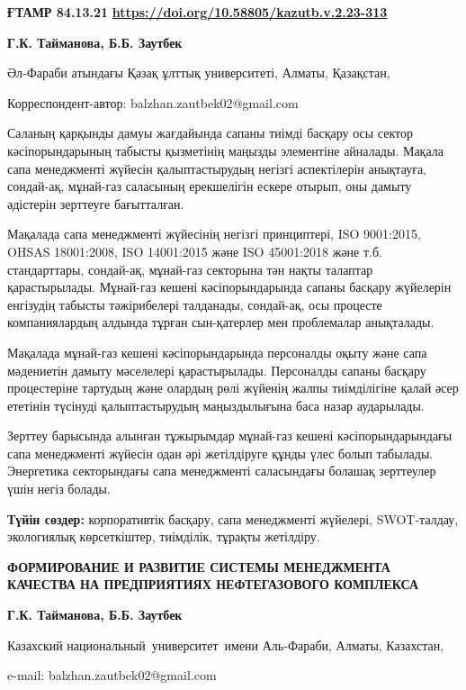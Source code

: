 \newpage
{}
{\bfseries ҒТАМР 84.13.21}
\hfill {\bfseries \href{https://doi.org/10.58805/kazutb.v.2.23-313}{https://doi.org/10.58805/kazutb.v.2.23-313}}


\begin{center}
{\bfseries Г.К. Тайманова, Б.Б. Заутбек\envelope}

Әл-Фараби атындағы Қазақ ұлттық университеті, Алматы, Қазақстан,

\envelope Корреспондент-автор:
balzhan.zautbek02@gmail.com
\end{center}

Саланың қарқынды дамуы жағдайында сапаны тиімді басқару осы сектор
кәсіпорындарының табысты қызметінің маңызды элементіне айналады. Мақала
сапа менеджменті жүйесін қалыптастырудың негізгі аспектілерін анықтауға,
сондай-ақ, мұнай-газ саласының ерекшелігін ескере отырып, оны дамыту
әдістерін зерттеуге бағытталған.

Мақалада сапа менеджменті жүйесінің негізгі принциптері, ISO 9001:2015,
OHSAS 18001:2008, ISO 14001:2015 және ISO 45001:2018 және т.б.
стандарттары, сондай-ақ, мұнай-газ секторына тән нақты талаптар
қарастырылады. Мұнай-газ кешені кәсіпорындарында сапаны басқару
жүйелерін енгізудің табысты тәжірибелері талданады, сондай-ақ, осы
процесте компаниялардың алдында тұрған сын-қатерлер мен проблемалар
анықталады.

Мақалада мұнай-газ кешені кәсіпорындарында персоналды оқыту және сапа
мәдениетін дамыту мәселелері қарастырылады. Персоналды сапаны басқару
процестеріне тартудың және олардың рөлі жүйенің жалпы тиімділігіне қалай
әсер ететінін түсінуді қалыптастырудың маңыздылығына баса назар
аударылады.

Зерттеу барысында алынған тұжырымдар мұнай-газ кешені кәсіпорындарындағы
сапа менеджменті жүйесін одан әрі жетілдіруге құнды үлес болып табылады.
Энергетика секторындағы сапа менеджменті саласындағы болашақ зерттеулер
үшін негіз болады.

{\bfseries Түйін сөздер:} корпоративтік басқару, сапа менеджменті жүйелері,
SWOT-талдау, экологиялық көрсеткіштер, тиімділік, тұрақты жетілдіру.

\begin{center}
{\large\bfseries ФОРМИРОВАНИЕ И РАЗВИТИЕ СИСТЕМЫ МЕНЕДЖМЕНТА КАЧЕСТВА НА
ПРЕДПРИЯТИЯХ НЕФТЕГАЗОВОГО КОМПЛЕКСА}

{\bfseries Г.К. Тайманова, Б.Б. Заутбек\envelope}

Казахский национальный~университет~имени Аль-Фараби, Алматы, Казахстан,

e-mail: balzhan.zautbek02@gmail.com
\end{center}

